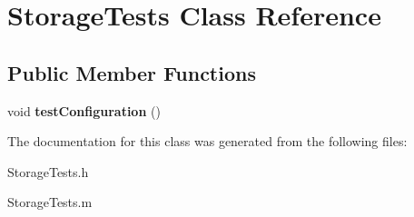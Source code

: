 \hypertarget{interface_storage_tests}{
\section{\-Storage\-Tests \-Class \-Reference}
\label{interface_storage_tests}
}
\subsection*{\-Public \-Member \-Functions}
\begin{DoxyCompactItemize}
\item 
\hypertarget{interface_storage_tests_ac0fec57e32a3606b76802db431a9476d}{
void {\bfseries test\-Configuration} ()}
\label{interface_storage_tests_ac0fec57e32a3606b76802db431a9476d}

\end{DoxyCompactItemize}


\-The documentation for this class was generated from the following files\-:\begin{DoxyCompactItemize}
\item 
\-Storage\-Tests.\-h\item 
\-Storage\-Tests.\-m\end{DoxyCompactItemize}
